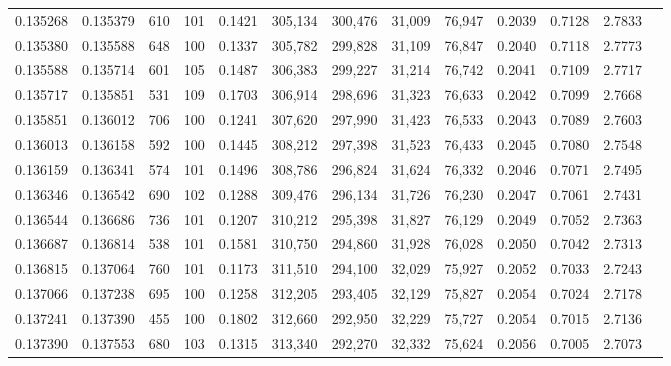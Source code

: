 \begin{tabular}{rrrrrrrrrrrrr}
0.135268 & 0.135379 &   610 & 101 &                                     0.1421 & 305,134 & 300,476 &  31,009 &  76,947 & 0.2039 & 0.7128 & 2.7833 \\
0.135380 & 0.135588 &   648 & 100 &                                     0.1337 & 305,782 & 299,828 &  31,109 &  76,847 & 0.2040 & 0.7118 & 2.7773 \\
0.135588 & 0.135714 &   601 & 105 &                                     0.1487 & 306,383 & 299,227 &  31,214 &  76,742 & 0.2041 & 0.7109 & 2.7717 \\
0.135717 & 0.135851 &   531 & 109 &                                     0.1703 & 306,914 & 298,696 &  31,323 &  76,633 & 0.2042 & 0.7099 & 2.7668 \\
0.135851 & 0.136012 &   706 & 100 &                                     0.1241 & 307,620 & 297,990 &  31,423 &  76,533 & 0.2043 & 0.7089 & 2.7603 \\
0.136013 & 0.136158 &   592 & 100 &                                     0.1445 & 308,212 & 297,398 &  31,523 &  76,433 & 0.2045 & 0.7080 & 2.7548 \\
0.136159 & 0.136341 &   574 & 101 &                                     0.1496 & 308,786 & 296,824 &  31,624 &  76,332 & 0.2046 & 0.7071 & 2.7495 \\
0.136346 & 0.136542 &   690 & 102 &                                     0.1288 & 309,476 & 296,134 &  31,726 &  76,230 & 0.2047 & 0.7061 & 2.7431 \\
0.136544 & 0.136686 &   736 & 101 &                                     0.1207 & 310,212 & 295,398 &  31,827 &  76,129 & 0.2049 & 0.7052 & 2.7363 \\
0.136687 & 0.136814 &   538 & 101 &                                     0.1581 & 310,750 & 294,860 &  31,928 &  76,028 & 0.2050 & 0.7042 & 2.7313 \\
0.136815 & 0.137064 &   760 & 101 &                                     0.1173 & 311,510 & 294,100 &  32,029 &  75,927 & 0.2052 & 0.7033 & 2.7243 \\
0.137066 & 0.137238 &   695 & 100 &                                     0.1258 & 312,205 & 293,405 &  32,129 &  75,827 & 0.2054 & 0.7024 & 2.7178 \\
0.137241 & 0.137390 &   455 & 100 &                                     0.1802 & 312,660 & 292,950 &  32,229 &  75,727 & 0.2054 & 0.7015 & 2.7136 \\
0.137390 & 0.137553 &   680 & 103 &                                     0.1315 & 313,340 & 292,270 &  32,332 &  75,624 & 0.2056 & 0.7005 & 2.7073 \\

\end{tabular}
